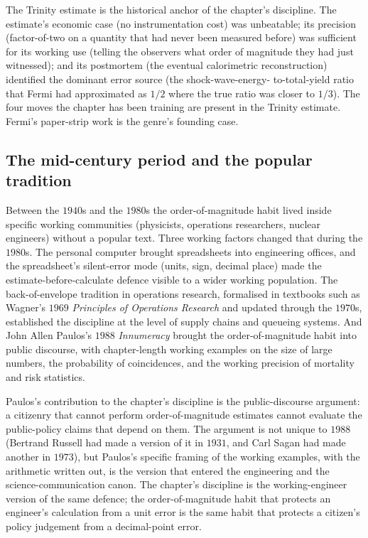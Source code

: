 The Trinity estimate is the historical anchor of the
chapter's discipline. The estimate's economic case (no
instrumentation cost) was unbeatable; its precision
(factor-of-two on a quantity that had never been measured
before) was sufficient for its working use (telling the
observers what order of magnitude they had just witnessed);
and its postmortem (the eventual calorimetric reconstruction)
identified the dominant error source (the shock-wave-energy-
to-total-yield ratio that Fermi had approximated as $1/2$
where the true ratio was closer to $1/3$). The four moves the
chapter has been training are present in the
Trinity estimate. Fermi's paper-strip work is the genre's
founding case.

\subsection{The mid-century period and the popular tradition}

Between the $1940$s and the $1980$s the order-of-magnitude
habit lived inside specific working communities (physicists,
operations researchers, nuclear engineers) without a popular
text. Three working factors changed that during the $1980$s.
The personal computer brought spreadsheets into engineering
offices, and the spreadsheet's silent-error mode (units,
sign, decimal place) made the estimate-before-calculate
defence visible to a wider working population. The
back-of-envelope tradition in operations research, formalised
in textbooks such as Wagner's $1969$ \emph{Principles of
Operations Research} and updated through the $1970$s,
established the discipline at the level of supply chains and
queueing systems. And John Allen Paulos's $1988$ \emph{Innumeracy}
\cite{text:ch09t3-paulos-1988} brought the order-of-magnitude
habit into public discourse, with chapter-length working
examples on the size of large numbers, the probability of
coincidences, and the working precision of mortality and
risk statistics.

Paulos's contribution to the chapter's discipline is the
public-discourse argument: a citizenry that cannot perform
order-of-magnitude estimates cannot evaluate the public-policy
claims that depend on them. The argument is not unique to
$1988$ (Bertrand Russell had made a version of it in $1931$,
and Carl Sagan had made another in $1973$), but Paulos's
specific framing of the working examples, with the
arithmetic written out, is the version that entered the
engineering and the science-communication canon. The
chapter's discipline is the working-engineer version of the
same defence; the order-of-magnitude habit that protects an
engineer's calculation from a unit error is the same habit
that protects a citizen's policy judgement from a
decimal-point error.

